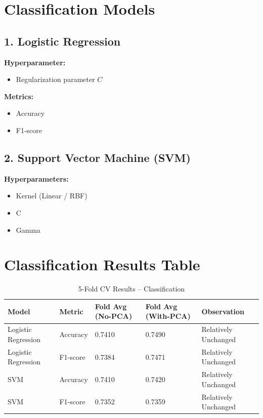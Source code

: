 \documentclass[11pt]{article}
\begin{document}
\section*{Classification Models}

\subsection*{1. Logistic Regression}

\textbf{Hyperparameter:}
\begin{itemize}
    \item Regularization parameter $C$
\end{itemize}

\textbf{Metrics:}
\begin{itemize}
    \item Accuracy
    \item F1-score
\end{itemize}

\subsection*{2. Support Vector Machine (SVM)}

\textbf{Hyperparameters:}
\begin{itemize}
    \item Kernel (Linear / RBF)
    \item C
    \item Gamma
\end{itemize}

\section*{Classification Results Table}

\begin{table}[H]
\centering
\caption{5-Fold CV Results – Classification}
\begin{tabularx}{\textwidth}{|X|X|X|X|X|}
\hline
\textbf{Model} & \textbf{Metric} & \textbf{Fold Avg (No-PCA)} & \textbf{Fold Avg (With-PCA)} & \textbf{Observation} \\
\hline
Logistic Regression & Accuracy & 0.7410 & 0.7490 & Relatively Unchanged \\
Logistic Regression & F1-score & 0.7384 & 0.7471 & Relatively Unchanged \\
SVM & Accuracy & 0.7410 & 0.7420 & Relatively Unchanged \\
SVM & F1-score & 0.7352 & 0.7359 & Relatively Unchanged \\
\hline
\end{tabularx}
\end{table}
\end{document}
